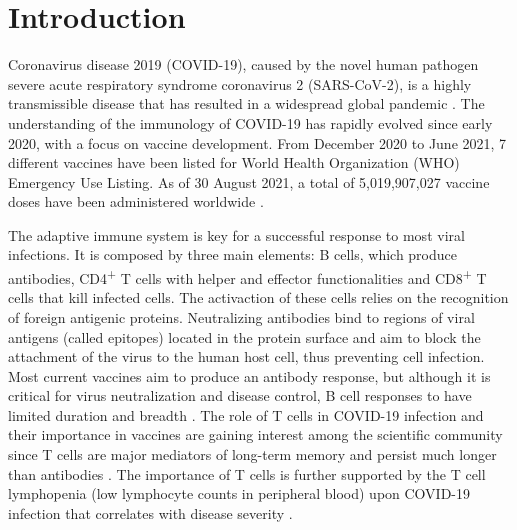 \chapter*{Introduction}
\label{cap:int}



Coronavirus disease 2019 (COVID-19), caused by the novel human pathogen severe acute respiratory syndrome coronavirus 2 (SARS-CoV-2), is a highly transmissible disease that has resulted in a widespread global pandemic \citep{hu}. The understanding of the immunology of COVID-19 has rapidly evolved since early 2020, with a focus on vaccine development. From December 2020 to June 2021, 7 different vaccines have been listed for World Health Organization (WHO) Emergency Use Listing. As of 30 August 2021, a total of 5,019,907,027 vaccine doses have been administered worldwide \citep{who}.

The adaptive immune system is key for a successful response to most viral infections. It is composed by three main elements: B cells, which produce antibodies, CD4\textsuperscript{+} T cells with helper and effector functionalities and CD8\textsuperscript{+} T cells that kill infected cells. The activaction of these cells relies on the recognition of foreign antigenic proteins. Neutralizing antibodies bind to regions of viral antigens (called epitopes) located in the protein surface and aim to block the attachment of the virus to the human host cell, thus preventing cell infection. Most current vaccines aim to produce an antibody response, but although it is critical for virus neutralization and disease control, B cell responses to \covid{} have limited duration and breadth \citep{vaccinetcell}. The role of T cells in COVID-19 infection and their importance in vaccines are gaining interest among the scientific community since T cells are major mediators of long-term memory and persist much longer than antibodies \citep{tcellsdiag}. The importance of T cells is further supported by the T cell lymphopenia (low lymphocyte counts in peripheral blood) upon COVID-19 infection that correlates with disease severity \citep{lymphopeniaseverity}.


